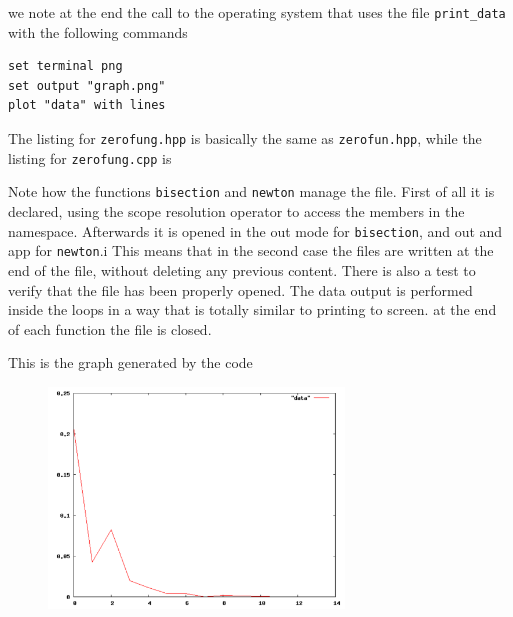 we note at the end the call to the operating system that uses the file
\texttt{print\_data} with the following commands
\begin{verbatim}
set terminal png
set output "graph.png"
plot "data" with lines
\end{verbatim}
The listing for \texttt{zerofung.hpp} is basically the same as
\texttt{zerofun.hpp}, while the listing for \texttt{zerofung.cpp} is
\lstset{basicstyle=\scriptsize\sf}
    
\lstset{basicstyle=\sf}

Note how the functions \texttt{bisection} and \texttt{newton} manage the file.
First of all it is declared, using the scope resolution operator \cpp{::} to
access the members in the  namespace. Afterwards it is opened in the
out mode for \texttt{bisection}, and out and app for \texttt{newton}.i This
means that in the second case the files are written at the end of the file,
without deleting any previous content. There is also a test to verify that the
file has been properly opened. The data output is performed inside the loops in
a way that is totally similar to printing to screen. at the end of each function
the file is closed.

This is the graph generated by the code
\begin{figure}[!h]
    \centering
    \includegraphics[width=0.7\textwidth]{./images/graph}
\end{figure}
